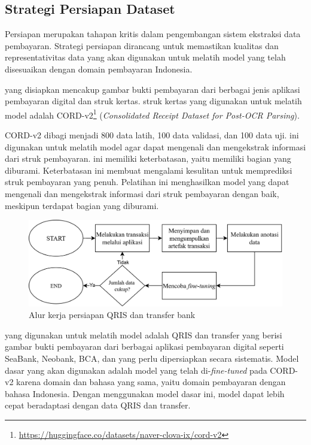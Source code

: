 \subsection{Strategi Persiapan Dataset}
\label{subsec:strategi-persiapan-dataset}

Persiapan \dataset{} merupakan tahapan kritis dalam pengembangan sistem ekstraksi data pembayaran. Strategi persiapan \dataset{} dirancang untuk memastikan kualitas dan representativitas data yang akan digunakan untuk melatih model \donut{} yang telah disesuaikan dengan domain pembayaran Indonesia.

\datasetfl{} yang disiapkan mencakup gambar bukti pembayaran dari berbagai jenis aplikasi pembayaran digital dan struk kertas. \datasetfl{} struk kertas yang digunakan untuk melatih model \donut{} adalah \dataset{} CORD-v2\footnote{\href{https://huggingface.co/datasets/naver-clova-ix/cord-v2}{https://huggingface.co/datasets/naver-clova-ix/cord-v2}} (\emph{Consolidated Receipt Dataset for Post-OCR Parsing}). 

\datasetfl{} CORD-v2 dibagi menjadi 800 data latih, 100 data validasi, dan 100 data uji. \datasetfl{} ini digunakan untuk melatih model \donut{} agar dapat mengenali dan mengekstrak informasi dari struk pembayaran. \datasetfl{} ini memiliki keterbatasan, yaitu memiliki bagian yang diburami. Keterbatasan ini membuat \donut{} mengalami kesulitan untuk memprediksi struk pembayaran yang penuh. Pelatihan ini menghasilkan model \donut{} yang dapat mengenali dan mengekstrak informasi dari struk pembayaran dengan baik, meskipun terdapat bagian yang diburami.
\begin{figure}[htbp]
    \centering
    \includegraphics[width=1\textwidth]{images/dataset-preparation-flow.png}
    \caption{Alur kerja persiapan \dataset{} QRIS dan transfer bank}
    \label{fig:dataset-preparation-flow}
\end{figure}

\datasetfl{} yang digunakan untuk melatih model \donut{} adalah \dataset{} QRIS dan transfer yang berisi gambar bukti pembayaran dari berbagai aplikasi pembayaran digital seperti SeaBank, Neobank, BCA, dan \gopay{} yang perlu dipersiapkan secara sistematis. Model \donut{} dasar yang akan digunakan adalah model \donut{} yang telah di-\emph{fine-tuned} pada \dataset{} CORD-v2 karena domain dan bahasa yang sama, yaitu domain pembayaran dengan bahasa Indonesia. Dengan menggunakan model dasar ini, model \donut{} dapat lebih cepat beradaptasi dengan data QRIS dan transfer.

